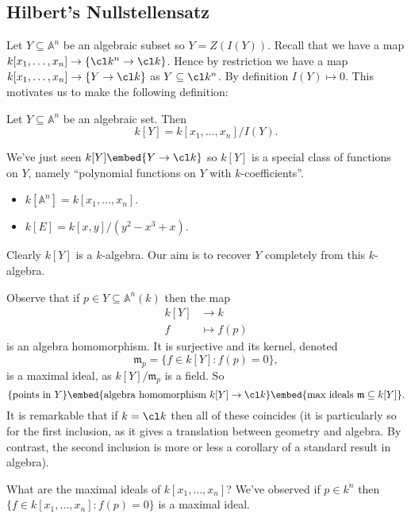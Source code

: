 \documentclass[a4paper]{article}
\renewcommand{\A}{\mathbb{A}}
\begin{document}
\subsection{Hilbert's Nullstellensatz}

Let \(Y \subseteq \A^n\) be an algebraic subset so \(Y = Z(I(Y))\). Recall that we have a map \(k[x_1, \dots, x_n] \to \{\cl k^n \to \cl k\}\). Hence by restriction we have a map \(k[x_1, \dots, x_n] \to \{Y \to \cl k\}\) as \(Y \subseteq \cl k^n\). By definition \(I(Y) \mapsto 0\). This motivates us to make the following definition:

\begin{definition}
  Let \(Y \subseteq \A^n\) be an algebraic set. Then
  \[
    k[Y] = k[x_1, \dots, x_n]/I(Y).
  \]
\end{definition}

We've just seen \(k[Y] \embed \{Y \to \cl k\}\) so \(k[Y]\) is a special class of functions on \(Y\), namely ``polynomial functions on \(Y\) with \(k\)-coefficients''.

\begin{eg}\leavevmode
  \begin{itemize}
  \item \(k[\A^n] = k[x_1, \dots, x_n]\).
  \item \(k[E] = k[x, y]/(y^2 - x^3 + x)\).
  \end{itemize}
\end{eg}

Clearly \(k[Y]\) is a \(k\)-algebra. Our aim is to recover \(Y\) completely from this \(k\)-algebra.

Observe that if \(p \in Y \subseteq \A^n(k)\) then the map
\begin{align*}
  k[Y] &\to k \\
  f &\mapsto f(p)
\end{align*}
is an algebra homomorphism. It is surjective and its kernel, denoted
\[
  \mathfrak m_p = \{f \in k[Y]: f(p) = 0\},
\]
is a maximal ideal, as \(k[Y]/\mathfrak m_p\) is a field. So
\[
  \{\text{points in } Y\} \embed \{\text{algebra homomorphism } k[Y] \to \cl k\} \embed \{\text{max ideals } \mathfrak m \subseteq k[Y]\}.
\]
It is remarkable that if \(k = \cl k\) then all of these coincides (it is particularly so for the first inclusion, as it gives a translation between geometry and algebra. By contrast, the second inclusion is more or less a corollary of a standard result in algebra).

What are the maximal ideals of \(k[x_1, \dots, x_n]\)? We've observed if \(p \in k^n\) then \(\{f \in k[x_1, \dots, x_n]: f(p) = 0\}\) is a maximal ideal.
\end{document}
